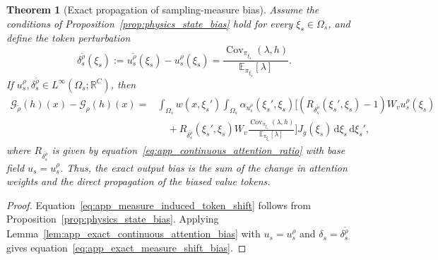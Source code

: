 \documentclass{article}
\def\eqref#1{equation~\ref{#1}}
\def\Eqref#1{Equation~\ref{#1}}
\newtheorem{theorem}[proposition]{Theorem}
\begin{document}
\begin{theorem}[Exact propagation of sampling-measure bias]
\label{thm:app_exact_measure_shift_bias}
Assume the conditions of Proposition~\ref{prop:physics_state_bias} hold for every $\xi_s\in\Omega_s$, and define the token perturbation
\begin{equation}
    \delta_s^{\widetilde{\rho}}(\xi_s)
    :=u_s^{\widetilde{\rho}}(\xi_s)-u_s^{\rho}(\xi_s)
    =\frac{\operatorname{Cov}_{\pi_{\xi_s}}(\lambda,h)}{\mathbb{E}_{\pi_{\xi_s}}[\lambda]}.
    \label{eq:app_measure_induced_token_shift}
\end{equation}
If $u_s^{\rho},\delta_s^{\widetilde{\rho}}\in L^{\infty}(\Omega_s;\mathbb{R}^{C})$, then
\begin{align}
    \mathcal{G}_{\widetilde{\rho}}(h)(x)-\mathcal{G}_{\rho}(h)(x)
    ={}&\int_{\Omega_s}w(x,\xi_s')
    \int_{\Omega_s}\alpha_{u_s^{\rho}}(\xi_s',\xi_s)
    \Big[(R_{\delta_s^{\widetilde{\rho}}}(\xi_s',\xi_s)-1)W_vu_s^{\rho}(\xi_s)
    \nonumber\\
    &\quad+R_{\delta_s^{\widetilde{\rho}}}(\xi_s',\xi_s)W_v
    \frac{\operatorname{Cov}_{\pi_{\xi_s}}(\lambda,h)}{\mathbb{E}_{\pi_{\xi_s}}[\lambda]}\Big]
    J_g(\xi_s)\,\mathrm{d}\xi_s\,\mathrm{d}\xi_s',
    \label{eq:app_exact_measure_shift_bias}
\end{align}
where $R_{\delta_s^{\widetilde{\rho}}}$ is given by \eqref{eq:app_continuous_attention_ratio} with base field $u_s=u_s^{\rho}$. Thus, the exact output bias is the sum of the change in attention weights and the direct propagation of the biased value tokens.
\end{theorem}

\begin{proof}
\Eqref{eq:app_measure_induced_token_shift} follows from Proposition~\ref{prop:physics_state_bias}. Applying Lemma~\ref{lem:app_exact_continuous_attention_bias} with $u_s=u_s^{\rho}$ and $\delta_s=\delta_s^{\widetilde{\rho}}$ gives \eqref{eq:app_exact_measure_shift_bias}.
\end{proof}
\end{document}
